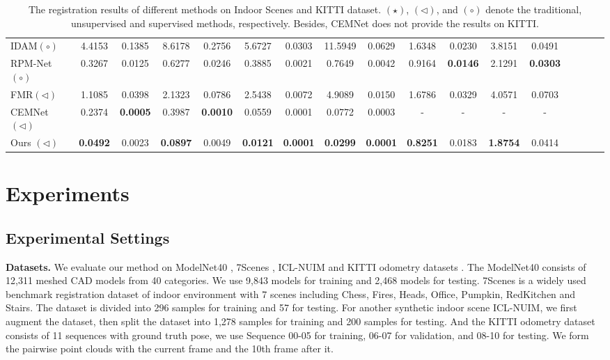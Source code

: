 \documentclass[letterpaper]{article} %
\begin{document}
\begin{table}
\begin{center}
{{\begin{tabular}{lcccc|cccc|cccccccc}
						IDAM$\left(\circ\right)$ &4.4153& 0.1385& 8.6178&0.2756&5.6727&0.0303&11.5949&0.0629 & 1.6348 & 0.0230 &3.8151 & 0.0491\\
						RPM-Net $\left(\circ\right)$ &0.3267 & 0.0125& 0.6277 &0.0246&0.3885 &0.0021 & 0.7649 &0.0042&0.9164 &\textbf{0.0146} &2.1291 &\textbf{0.0303}\\
						FMR$\left(\triangleleft\right)$ & 1.1085& 0.0398&2.1323&0.0786& 2.5438&0.0072&4.9089&0.0150& 1.6786&0.0329 &4.0571 & 0.0703\\
						CEMNet $\left(\triangleleft\right)$ &0.2374&\textbf{0.0005}& 0.3987 & \textbf{0.0010} &0.0559&0.0001&0.0772&0.0003&-&-&-&-\\ %
						\midrule 
						Ours $\left(\triangleleft\right)$ &\textbf{0.0492}& 0.0023&\textbf{0.0897}& 0.0049& \textbf{0.0121}& \textbf{0.0001}& \textbf{0.0299}& \textbf{0.0001}& \textbf{0.8251}& 0.0183& \textbf{1.8754}& 0.0414\\
						\bottomrule
				\end{tabular}}
			}
		\end{center}
		\caption{The registration results of different methods on Indoor Scenes and KITTI dataset. $\left(\star\right)$, $\left(\triangleleft\right)$, and $\left(\circ\right)$ denote the traditional, unsupervised and supervised methods, respectively. Besides, CEMNet does not provide the results on KITTI.}
		\label{table9}
		\vskip -5pt
	\end{table}
	
	\section{Experiments}
	\subsection{Experimental Settings}
	\noindent \textbf{Datasets.} We evaluate our method on ModelNet40 \cite{wu20153d}, 7Scenes \cite{shotton2013scene}, ICL-NUIM \cite{choi2015robust} and KITTI odometry datasets \cite{geiger2012we}. The ModelNet40 consists of 12,311 meshed CAD models from 40 categories. We use 9,843 models for training and 2,468 models for testing. 7Scenes is a widely used benchmark registration dataset of indoor environment with 7 scenes including Chess, Fires, Heads, Office, Pumpkin, RedKitchen and Stairs.
	The dataset is divided into 296 samples for training and 57 for testing. 
	For another synthetic indoor scene ICL-NUIM, we first augment the dataset, then split the dataset into 1,278 samples for training and 200 samples for testing. And the KITTI odometry dataset consists of 11 sequences with ground truth pose, we use Sequence 00-05 for training, 06-07 for validation, and 08-10 for testing. We form the pairwise point clouds with the current frame and the 10th frame after it.
	
\end{document}

